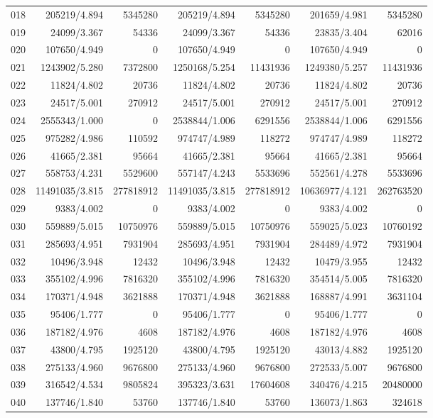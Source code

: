 \begin{longtable}{crrrrrr}
018 & 205219/4.894 & 5345280 & 205219/4.894 & 5345280 & 201659/4.981 & 5345280 \\
019 & 24099/3.367 & 54336 & 24099/3.367 & 54336 & 23835/3.404 & 62016 \\
020 & 107650/4.949 & 0 & 107650/4.949 & 0 & 107650/4.949 & 0 \\
021 & 1243902/5.280 & 7372800 & 1250168/5.254 & 11431936 & 1249380/5.257 & 11431936 \\
022 & 11824/4.802 & 20736 & 11824/4.802 & 20736 & 11824/4.802 & 20736 \\
023 & 24517/5.001 & 270912 & 24517/5.001 & 270912 & 24517/5.001 & 270912 \\
024 & 2555343/1.000 & 0 & 2538844/1.006 & 6291556 & 2538844/1.006 & 6291556 \\
025 & 975282/4.986 & 110592 & 974747/4.989 & 118272 & 974747/4.989 & 118272 \\
026 & 41665/2.381 & 95664 & 41665/2.381 & 95664 & 41665/2.381 & 95664 \\
027 & 558753/4.231 & 5529600 & 557147/4.243 & 5533696 & 552561/4.278 & 5533696 \\
028 & 11491035/3.815 & 277818912 & 11491035/3.815 & 277818912 & 10636977/4.121 & 262763520 \\
029 & 9383/4.002 & 0 & 9383/4.002 & 0 & 9383/4.002 & 0 \\
030 & 559889/5.015 & 10750976 & 559889/5.015 & 10750976 & 559025/5.023 & 10760192 \\
031 & 285693/4.951 & 7931904 & 285693/4.951 & 7931904 & 284489/4.972 & 7931904 \\
032 & 10496/3.948 & 12432 & 10496/3.948 & 12432 & 10479/3.955 & 12432 \\
033 & 355102/4.996 & 7816320 & 355102/4.996 & 7816320 & 354514/5.005 & 7816320 \\
034 & 170371/4.948 & 3621888 & 170371/4.948 & 3621888 & 168887/4.991 & 3631104 \\
035 & 95406/1.777 & 0 & 95406/1.777 & 0 & 95406/1.777 & 0 \\
036 & 187182/4.976 & 4608 & 187182/4.976 & 4608 & 187182/4.976 & 4608 \\
037 & 43800/4.795 & 1925120 & 43800/4.795 & 1925120 & 43013/4.882 & 1925120 \\
038 & 275133/4.960 & 9676800 & 275133/4.960 & 9676800 & 272533/5.007 & 9676800 \\
039 & 316542/4.534 & 9805824 & 395323/3.631 & 17604608 & 340476/4.215 & 20480000 \\
040 & 137746/1.840 & 53760 & 137746/1.840 & 53760 & 136073/1.863 & 324618 \\

\end{longtable}
